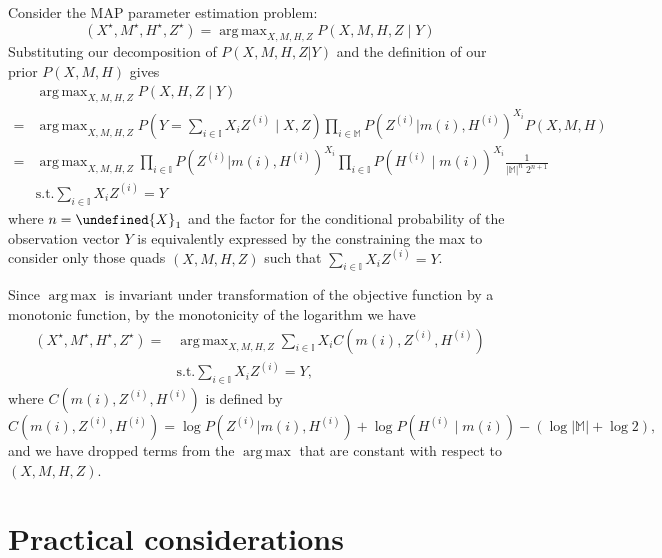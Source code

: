 \documentclass[twoside, 11pt]{article}
\let\norm\undefined
\DeclarePairedDelimiter\norm{\lVert}{\rVert}
\newcommand{\mm}[0] {\mathbb{M}} %
\newcommand{\II}[0] {\mathbb{I}} %
\newcommand{\traj}[1] {H^{(#1)}}
\newcommand{\eventseq}[1] {Z^{(#1)}}
\DeclareMathOperator*{\argmax}{arg\,max}
\begin{document}

Consider the MAP parameter estimation problem:
\begin{equation}
(X^{\star}, M^{\star}, H^{\star}, Z^{\star}) = \argmax_{X, M, H, Z} P\left(X, M, H, Z \mid Y\right)
\end{equation}
Substituting our decomposition of $P(X, M, H, Z | Y)$ and the definition of our prior $P(X, M, H)$ gives
\begin{align*}
& \argmax_{X, M, H, Z} P\left(X, H, Z \mid Y\right) \\
= & \argmax_{X, M, H, Z}
P\left(Y = \sum_{i \in \II} X_i \eventseq i \mid X, Z \right)
\prod_{i \in \mm} P\left(\eventseq i | m(i), \traj i\right)^{X_i} P(X, M, H) \\
= & \argmax_{X, M, H, Z} \prod_{i \in \II} P\left(\eventseq i | m(i), \traj i\right)^{X_i}
\prod_{i \in \II} P(\traj i \mid m(i))^{X_i}
\frac{1}{|\mm|^n \; 2^{n+1}} \\
 & \mathrm{s.t.} \sum_{i \in \II} X_i \eventseq i = Y
\end{align*}
where $n = \norm{X}_1$ and the factor for the conditional probability of the observation vector $Y$ is equivalently expressed by the constraining the max to consider only those quads $(X, M, H, Z)$ such that $\sum_{i \in \II} X_i \eventseq i = Y$.

Since $\argmax$ is invariant under transformation of the objective function by a monotonic function, by the monotonicity of the logarithm we have
\begin{align}
(X^{\star}, M^{\star}, H^{\star}, Z^{\star})
= & \argmax_{X, M, H, Z} \sum_{i \in \II} X_i C(m(i), \eventseq i, \traj i) \\
 & \mathrm{s.t.} \sum_{i \in \II} X_i \eventseq i = Y ,
\end{align}
where $C(m(i), \eventseq i, \traj i)$ is defined by
\begin{equation*}
C(m(i), \eventseq i, \traj i) =
\log P\left(\eventseq i | m(i), \traj i\right) + 
\log P(\traj i \mid m(i)) -
\left ( \log |\mm| + \log 2 \right) ,
\end{equation*}
and we have dropped terms from the $\argmax$ that are constant
with respect to $(X, M, H, Z)$.


\section{Practical considerations}
\end{document}
